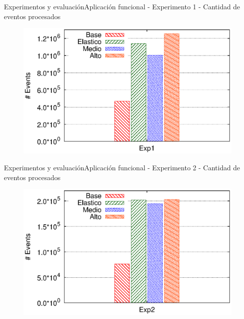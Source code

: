 
\begin{frame}{Experimentos y evaluación}{Aplicación funcional - Experimento 1 - Cantidad de eventos procesados}

\begin{figure}[p]
	\centering
	\includegraphics[scale=0.7]{images/exp/app1/dynamic/exp1-eventTotal.eps}
\end{figure}
\end{frame}

\begin{frame}{Experimentos y evaluación}{Aplicación funcional - Experimento 2 - Cantidad de eventos procesados}

\begin{figure}[p]
	\centering
	\includegraphics[scale=0.7]{images/exp/app1/dynamic/exp2-eventTotal.eps}
\end{figure}
\end{frame}